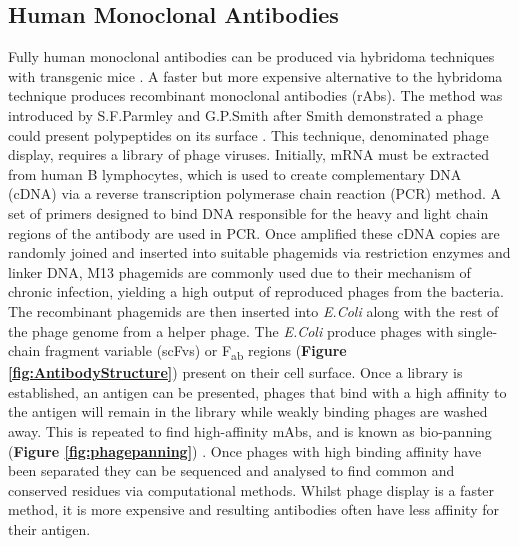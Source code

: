 \subsection{Human Monoclonal Antibodies}

Fully human monoclonal antibodies can be produced via hybridoma techniques with transgenic mice \cite{lonbergAntigenspecificHumanAntibodies1994}. A faster but more expensive alternative to the hybridoma technique produces recombinant monoclonal antibodies (rAbs). The method was introduced by S.F.Parmley and G.P.Smith after Smith demonstrated a phage could present polypeptides on its surface \cite{parmleyAntibodyselectableFilamentousFd1988,smithFilamentousFusionPhage1985}. This technique, denominated phage display, requires a library of phage viruses. Initially, mRNA must be extracted from human B lymphocytes, which is used to create complementary DNA (cDNA) via a reverse transcription polymerase chain reaction (PCR) method. A set of primers designed to bind DNA responsible for the heavy and light chain regions of the antibody are used in PCR. Once amplified these cDNA copies are randomly joined and inserted into suitable phagemids via restriction enzymes and linker DNA, M13 phagemids are commonly used due to their mechanism of chronic infection, yielding a high output of reproduced phages from the bacteria. The recombinant phagemids are then inserted into \emph{E.Coli} along with the rest of the phage genome from a helper phage. The \emph{E.Coli} produce phages with single-chain fragment variable (scFvs) or F\textsubscript{ab} regions (\textbf{Figure \ref{fig:AntibodyStructure}}) present on their cell surface. Once a library is established, an antigen can be presented, phages that bind with a high affinity to the antigen will remain in the library while weakly binding phages are washed away. This is repeated to find high-affinity mAbs, and is known as bio-panning (\textbf{Figure \ref{fig:phagepanning}}) \cite{azzazyPhageDisplayTechnology2002, marksBypassingImmunization1991}. Once phages with high binding affinity have been separated they can be sequenced and analysed to find common and conserved residues via computational methods. Whilst phage display is a faster method, it is more expensive and resulting antibodies often have less affinity for their antigen.

